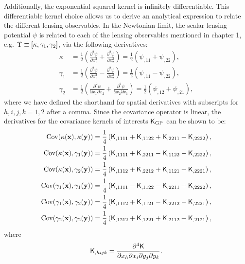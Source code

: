 Additionally, the exponential squared kernel is infinitely differentiable. This
differentiable kernel choice allows us to derive an analytical expression to
relate the different lensing observables.  
In the Newtonian limit, the scalar lensing potential $\psi$ is related to 
each of the lensing observables mentioned in chapter 1, e.g. $\Upsilon \equiv [\kappa, \gamma_1,
\gamma_2]$, via the following derivatives:
\begin{align}
\kappa &= \frac{1}{2}\left(\frac{\partial^2 \psi}{\partial x_1^2} +
\frac{\partial^2 \psi}{\partial x_2^2 }\right) 
= \frac{1}{2} (\psi_{,11} + \psi_{,22}),\\ 
\gamma_1 
&=\frac{1}{2}\left(\frac{\partial^2 \psi}{\partial x_1^2} - 
\frac{\partial^2 \psi}{\partial x_2^2}\right) 
= \frac{1}{2} (\psi_{,11} - \psi_{,22}), \\
\gamma_2 
&=\frac{1}{2}\left(\frac{\partial^2 \psi}{\partial x_1 \partial
x_2} + \frac{\partial^2 \psi}{\partial x_2 \partial x_1}\right)
= \frac{1}{2} (\psi_{,12} + \psi_{,21}), 
\end{align}
where we have defined the shorthand for spatial derivatives with
subscripts for $h,i,j,k = 1, 2$ after a comma.
Since the covariance operator is linear,
the derivatives for the covariance kernels of interests $\mathsf{K}_{\rm GP}$
can be shown to be:
\begin{align}
	\label{eq:kernel_derivatives1}
	\mathrm{Cov} (\kappa(\mathbf{x}), \kappa(\mathbf{y}))
&= \frac{1}{4}\left(
\mathsf{K}_{,1111} + \mathsf{K}_{,1122} + \mathsf{K}_{,2211} + \mathsf{K}_{,2222}
\right), \\
\mathrm{Cov}(\kappa(\mathbf{x}), \gamma_1(\mathbf{y})) &= \frac{1}{4}\left(
\mathsf{K}_{,1111} + \mathsf{K}_{,2211} - \mathsf{K}_{,1122} - \mathsf{K}_{,2222}
\right), \\
\mathrm{Cov}(\kappa(\mathbf{x}), \gamma_2(\mathbf{y})) &= \frac{1}{4}\left(
\mathsf{K}_{,1112} + \mathsf{K}_{,2212} + \mathsf{K}_{,1121} + \mathsf{K}_{,2221}
\right),\\
\mathrm{Cov}(\gamma_1(\mathbf{x}), \gamma_1(\mathbf{y})) &= \frac{1}{4}\left(
\mathsf{K}_{,1111} - \mathsf{K}_{,1122} - \mathsf{K}_{,2211} + \mathsf{K}_{,2222}
\right), \\
\mathrm{Cov}(\gamma_1(\mathbf{x}), \gamma_2(\mathbf{y})) &= \frac{1}{4}\left(
\mathsf{K}_{,1112} + \mathsf{K}_{,1121} - \mathsf{K}_{,2212} - \mathsf{K}_{,2221}
\right), \\
\mathrm{Cov}(\gamma_2(\mathbf{x}), \gamma_2(\mathbf{y})) &= \frac{1}{4}\left(
\mathsf{K}_{,1212} + \mathsf{K}_{,1221} + \mathsf{K}_{,2112} + \mathsf{K}_{,2121}
\right),
	\label{eq:kernel_derivatives2}
\end{align}
where
\begin{equation}
	\mathsf{K}_{,hijk} = \frac{\partial^4 \mathsf{K}}{\partial x_h \partial x_i
	\partial y_j \partial y_k}.
\end{equation}

